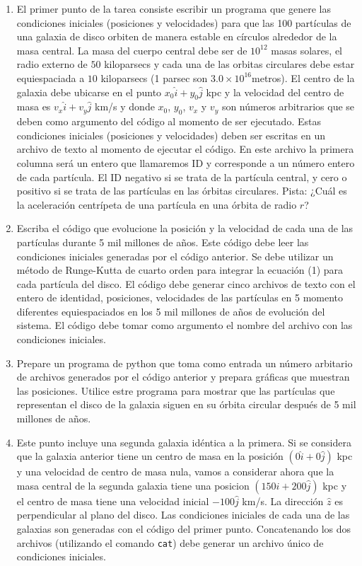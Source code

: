 \documentclass{article}
\begin{document}
\begin{enumerate}
\item El primer punto de la tarea consiste escribir un programa que genere
  las condiciones  iniciales (posiciones y velocidades) para que las
  100 part\'iculas de una galaxia de disco orbiten de manera estable
  en c\'irculos alrededor de la masa  central. La masa del cuerpo
  central debe ser de $10^{12}$ masas solares, el radio externo de
  $50$ kiloparsecs y cada una de las orbitas circulares debe estar
  equiespaciada a $10$ kiloparsecs (1 parsec son
  $3.0\times10^{16}$metros).  El centro de la galaxia debe ubicarse en
  el punto $x_{0}\hat{i} + y_{0}\hat{j}$ kpc y la velocidad del centro de
  masa es $v_x\hat{i}+v_y\hat{j}$ km/s y donde $x_{0}$, $y_{0}$,
  $v_{x}$ y $v_{y}$ son
  n\'umeros arbitrarios que se deben como argumento del c\'odigo al
  momento de ser ejecutado. Estas condiciones iniciales (posiciones y
  velocidades) deben ser
  escritas en un archivo de texto al momento de ejecutar el
  c\'odigo. En este archivo la primera columna ser\'a un entero que
  llamaremos ID y corresponde a un n\'umero entero de cada
  part\'icula. El ID negativo si se trata de la part\'icula
  central, y cero o positivo si se trata de las part\'iculas en las \'orbitas
  circulares. Pista: ¿Cu\'al es la aceleraci\'on centr\'ipeta de una
  part\'icula en una  \'orbita de radio $r$? 
\item 
  Escriba el c\'odigo que evolucione la posici\'on y la velocidad de
  cada una de las part\'iculas durante 5 mil millones de
  a\~nos.  Este c\'odigo debe leer las condiciones iniciales generadas
  por el c\'odigo anterior. Se debe utilizar un m\'etodo de
  Runge-Kutta de cuarto orden para integrar la ecuaci\'on (1) para
  cada part\'icula del disco.  El c\'odigo debe generar cinco archivos
  de texto con el entero de identidad, posiciones, velocidades de las part\'iculas en 5  momento diferentes equiespaciados en los 5 mil millones de a\~nos de
  evoluci\'on del sistema. El c\'odigo debe tomar como argumento el
  nombre del archivo con las condiciones iniciales. 
\item 
  Prepare un programa de python que toma como entrada un n\'umero arbitario de 
  archivos generados por el c\'odigo anterior y prepara gr\'aficas que
  muestran las posiciones.  Utilice estre programa para mostrar que
  las part\'iculas que representan el disco de la galaxia siguen en su
  \'orbita circular despu\'es de 5 mil millones de a\~nos. 
\item 
  Este punto incluye una segunda galaxia id\'entica a la
  primera. Si se considera que la galaxia anterior tiene un centro de
  masa en la posici\'on $(0\hat{i}+0\hat{j})$ kpc y una velocidad de centro de
  masa nula, vamos a considerar ahora que la masa central de la
  segunda galaxia tiene una posicion $(150\hat{i}+200\hat{j})$ kpc y
  el centro de masa  tiene una velocidad inicial $-100\hat{j}$ km/s. La
  direcci\'on $\hat{z}$ es perpendicular al plano del disco. 
  Las condiciones iniciales de cada una de las galaxias son generadas
  con el c\'odigo del primer punto. Concatenando los dos archivos
  (utilizando el comando \verb"cat") debe generar un archivo \'unico
  de condiciones iniciales.
  

\end{enumerate}
\end{document}
